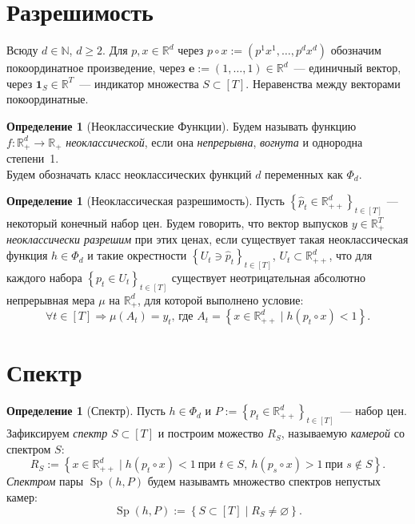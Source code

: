 \documentclass[a4paper,11pt]{article}
\theoremstyle{plain}
\theoremstyle{definition}
\newtheorem{definition}[theorem]{Определение}
\theoremstyle{remark}
\newcommand{\R}{\mathbb{R}}
\newcommand{\N}{\mathbb{N}}
\newcommand{\set}[1]{\left\{ #1 \right\}}
\newcommand{\Rpp}[1][2]{\R^{#1}_{++}} %
\newcommand{\Rp}[1][2]{\R^{#1}_{+}}   %
\DeclareMathOperator{\Sp}{Sp}
\begin{document}
\section{Разрешимость}

Всюду $d\in\N$, $d\ge2$. Для $p,x\in\R^d$ через $p\circ x:=(p^1x^1,\dots,p^dx^d)$ обозначим покоординатное произведение, через $\mathbf e:=(1,\dots,1)\in\R^d$~--- единичный вектор, через $\mathbf 1_S\in\R^T$~--- индикатор множества $S\subset[T]$. Неравенства между векторами покоординатные.

\begin{definition}[Неоклассические Функции]\label{def:neoclassical}
    Будем называть функцию $f:\Rp[d]\to\R_{+}$ \textit{неоклассической}, если она \textit{непрерывна}, \textit{вогнута} и однородна степени~1.\\
    Будем обозначать класс неоклассических функций $d$ переменных как $\Phi_d$.
\end{definition}

\begin{definition}[Неоклассическая разрешимость]\label{def:neo-solvability}
    Пусть $\set{\hat p_t\in\Rpp[d]}_{t\in[T]}$ --- некоторый конечный набор цен.
    Будем говорить, что вектор выпусков $y\in\Rp[T]$ \textit{неоклассически разрешим} при этих ценах, если
    существует такая неоклассическая функция $h\in\Phi_{d}$ и такие окрестности
    $\set{U_t\ni\hat p_t}_{t\in[T]}$, $U_t\subset\Rpp[d]$, что для каждого набора $\set{p_t\in U_t}_{t\in[T]}$
    существует неотрицательная абсолютно непрерывная мера $\mu$ на $\Rp[d]$, для которой выполнено условие: 
    \[\forall t\in[T]\Rightarrow\mu(A_t)=y_t\text{, где }{A_t=\set{x\in\Rpp[d]\mid h(p_t\circ x)<1}}.\]
\end{definition}

\section{Спектр}

\begin{definition}[Спектр]\label{def:spectrum}
    Пусть $h\in\Phi_d$ и $P:=\set{p_t\in\Rpp[d]}_{t\in[T]}$~--- набор цен. Зафиксируем \textit{спектр} $S\subset[T]$ и построим можество $R_S$, называемую \textit{камерой} со спектром $S$:
    \[
        R_S:=\set{x\in\Rpp[d]\mid h(p_t\circ x)<1\ \text{при } t\in S,\ h(p_s\circ x)>1\ \text{при } s\notin S}.
    \]
    \textit{Спектром} пары $\Sp(h,P)$ будем называмть множество спектров непустых камер: \[\Sp(h,P):=\set{S\subset[T]\mid R_S\neq\varnothing}.\]
\end{definition}
\end{document}
